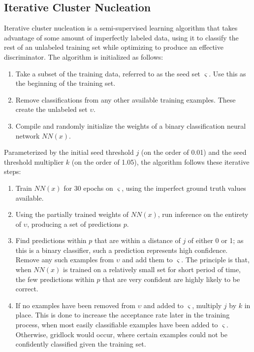 \documentclass[10pt]{article}
\begin{document}
\subsection{Iterative Cluster Nucleation}

Iterative cluster nucleation is a semi-supervised learning algorithm that takes advantage of some amount of imperfectly labeled data, using it to classify the rest of an unlabeled training set while optimizing to produce an effective discriminator. The algorithm is initialized as follows:

\begin{enumerate}
    \item Take a subset of the training data, referred to as the seed set $\varsigma$. Use this as the beginning of the training set.
    \item Remove classifications from any other available training examples. These create the unlabeled set $\upsilon$.
    \item Compile and randomly initialize the weights of a binary classification neural network $NN(x)$.
\end{enumerate}

Parameterized by the initial seed threshold $j$ (on the order of 0.01) and the seed threshold multiplier $k$ (on the order of 1.05), the algorithm follows these iterative steps:

\begin{enumerate}
    \item Train $NN(x)$ for 30 epochs on $\varsigma$, using the imperfect ground truth values available.
    \item Using the partially trained weights of $NN(x)$, run inference on the entirety of $\upsilon$, producing a set of predictions $p$.
    \item Find predictions within $p$ that are within a distance of $j$ of either 0 or 1; as this is a binary classifier, such a prediction represents high confidence. Remove any such examples from $\upsilon$ and add them to $\varsigma$. The principle is that, when $NN(x)$ is trained on a relatively small set for short period of time, the few predictions within $p$ that are very confident are highly likely to be correct.
    \item If no examples have been removed from $\upsilon$ and added to $\varsigma$, multiply $j$ by $k$ in place. This is done to increase the acceptance rate later in the training process, when most easily classifiable examples have been added to $\varsigma$. Otherwise, gridlock would occur, where certain examples could not be confidently classified given the training set.
\end{enumerate}

\printbibliography
\end{document}
